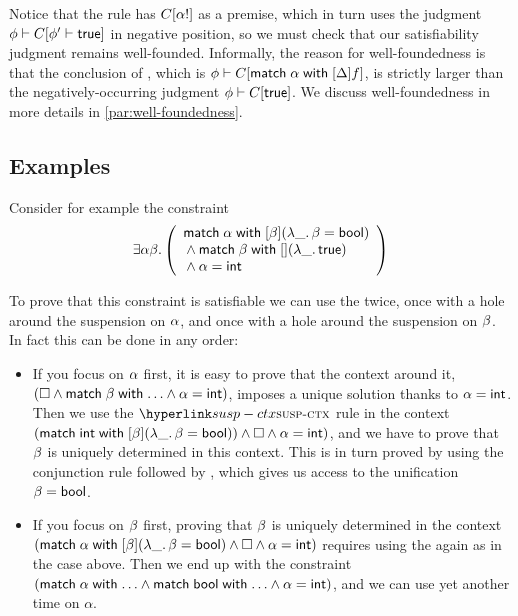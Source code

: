 \documentclass[acmsmall,screen,nonacm]{acmart}
\begin{document}
Notice that the rule  has $C[\alpha!]$ as a premise, which in
turn uses the judgment $\phi \vdash C[\phi' \vdash \mathsf{true}]$ in
negative position, so we must check that our satisfiability judgment remains
well-founded. Informally, the reason for well-foundedness is that the
conclusion of , which is $\phi \vdash C[\mathopen{}\mathrel{\mathsf{match}} \alpha \mathrel{\mathsf{with}} [ \Delta ] f]$, is strictly larger than the negatively-occurring judgment
$\phi \vdash C[\mathsf{true}]$. We discuss well-foundedness in more details in
\cref{par:well-foundedness}.

\subsection{Examples}

Consider for example the constraint
$$
  \exists \alpha \beta.
  \left(\begin{array}{l}
    \mathopen{}\mathrel{\mathsf{match}} \alpha \mathrel{\mathsf{with}} [ \beta ] (\lambda {{\_}}. \,{\beta = \mathsf{bool}}) \\
    {} \wedge \mathopen{}\mathrel{\mathsf{match}} \beta \mathrel{\mathsf{with}} [  ] (\lambda {{\_}}. \,{\mathsf{true}}) \\
    {} \wedge \alpha = \mathsf{int}
  \end{array}\right)
$$

To prove that this constraint is satisfiable we can use the 
twice, once with a hole around the suspension on $\alpha$, and once with a
hole around the suspension on $\beta$. In fact this can be done in any order:
\begin{itemize}
\item
  If you focus on $\alpha$ first, it is easy to prove that the context around
  it, $(\square \cand \cmatchdots \tvb \cand \tva = \tint)$, imposes a
  unique solution thanks to $\alpha = \mathsf{int}$. Then we use the
  $\Rule{susp-ctx}$ rule in the context $(\mathopen{}\mathrel{\mathsf{match}} \mathsf{int} \mathrel{\mathsf{with}} [ \beta ] (\lambda {{\_}}. \,{\beta = \mathsf{bool}})) \wedge \square \wedge \alpha = \mathsf{int})$, and we have
  to prove that $\beta$ is uniquely determined in this context. This is in
  turn proved by using the conjunction rule followed by ,
  which gives us access to the unification $\beta = \mathsf{bool}$.

\item
  If you focus on $\beta$ first, proving that $\beta$ is uniquely determined
  in the context $(\mathopen{}\mathrel{\mathsf{match}} \alpha \mathrel{\mathsf{with}} [ \beta ] (\lambda {{\_}}. \,{\beta = \mathsf{bool}}) \wedge
  \square \wedge \alpha = \mathsf{int})$ requires using the  again as
  in the case above. Then we end up with the constraint $(\cmatchdots \tva
  \cand \cmatchdots \tbool \cand \tva = \tint)$, and we can use
   yet another time on $\alpha$.

\end{itemize}
\end{document}
